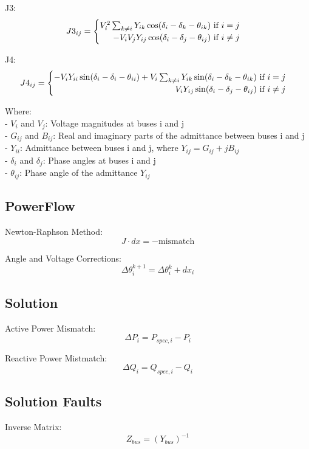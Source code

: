 \documentclass{article}
\begin{document}
	\noindent
	J3: 
	\[
	J3_{ij} = 
	\begin{cases}
		\hfill V_i^2 \sum_{k \neq i} Y_{ik} \cos(\delta_i - \delta_k - \theta_{ik}) \text{ if } i = j \\
		\hfill -V_i V_j Y_{ij} \cos(\delta_i - \delta_j - \theta_{ij}) \text{ if } i \neq j
	\end{cases}
	\]
	
	\noindent
	J4: 
	\[
	J4_{ij} = 
	\begin{cases}
		\hfill -V_i Y_{ii} \sin(\delta_i - \delta_i - \theta_{ii}) + V_i \sum_{k \neq i} Y_{ik} \sin(\delta_i - \delta_k - \theta_{ik}) \text{ if } i = j \\
		\hfill V_i Y_{ij} \sin(\delta_i - \delta_j - \theta_{ij}) \text{ if } i \neq j
	\end{cases}
	\]
	
	\noindent
	Where: \\
	- $V_i$ and $V_j$: Voltage magnitudes at buses i and j \\
	- $G_{ij}$ and $B_{ij}$: Real and imaginary parts of the admittance between buses i and j \\
	- $Y_{ii}$: Admittance between buses i and j, where $Y_{ij} = G_{ij} + j B_{ij}$ \\
	- $\delta_i$ and $\delta_j$: Phase angles at buses i and j \\
	- $\theta_{ij}$: Phase angle of the admittance $Y_{ij}$
	
	\subsection*{PowerFlow}
	Newton-Raphson Method: 
	\[
	J \cdot dx = -\text{mismatch}
	\]
	
	\noindent
	Angle and Voltage Corrections: 
	\[
	\Delta \theta_{i}^{k+1} = \Delta \theta_i^k + dx_i
	\]
	
	\subsection*{Solution}
	Active Power Mismatch: 
	\[
	\Delta P_i = P_{spec,i} - P_i
	\]
	
	\noindent	
	Reactive Power Mistmatch: 
	\[
	\Delta Q_i = Q_{spec,i} - Q_i
	\]
	
	\subsection*{Solution Faults}
	Inverse Matrix: 
	\[
	Z_{bus} = (Y_{bus})^{-1}
	\]
	
\end{document}
